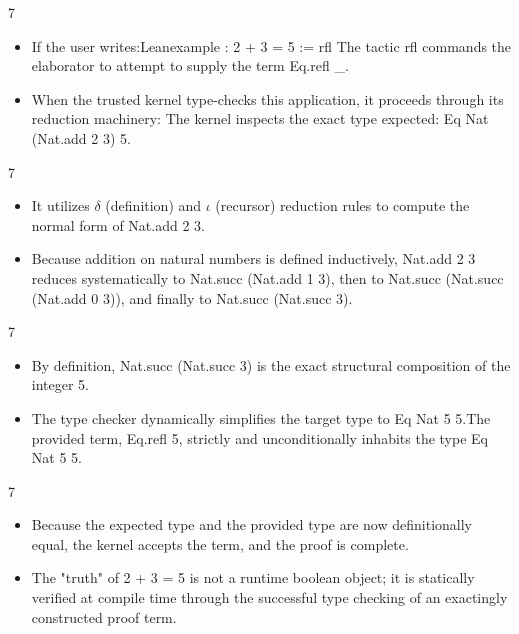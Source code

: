\documentclass[10pt]{beamer}
\begin{document}
\begin{frame}{7}
\begin{itemize}\setlength{\itemsep}{1.5em}
  \item If the user writes:Leanexample : 2 + 3 = 5 := rfl
The tactic rfl commands the elaborator to attempt to supply the term Eq.refl \_.
  \item When the trusted kernel type-checks this application, it proceeds through its reduction machinery:
The kernel inspects the exact type expected: Eq Nat (Nat.add 2 3) 5.
\end{itemize}
\end{frame}

\begin{frame}{7}
\begin{itemize}\setlength{\itemsep}{1.5em}
  \item It utilizes $\delta$ (definition) and $\iota$ (recursor) reduction rules to compute the normal form of Nat.add 2 3.
  \item Because addition on natural numbers is defined inductively, Nat.add 2 3 reduces systematically to Nat.succ (Nat.add 1 3), then to Nat.succ (Nat.succ (Nat.add 0 3)), and finally to Nat.succ (Nat.succ 3).
\end{itemize}
\end{frame}

\begin{frame}{7}
\begin{itemize}\setlength{\itemsep}{1.5em}
  \item By definition, Nat.succ (Nat.succ 3) is the exact structural composition of the integer 5.
  \item The type checker dynamically simplifies the target type to Eq Nat 5 5.The provided term, Eq.refl 5, strictly and unconditionally inhabits the type Eq Nat 5 5.
\end{itemize}
\end{frame}

\begin{frame}{7}
\begin{itemize}\setlength{\itemsep}{1.5em}
  \item Because the expected type and the provided type are now definitionally equal, the kernel accepts the term, and the proof is complete.
  \item The "truth" of 2 + 3 = 5 is not a runtime boolean object; it is statically verified at compile time through the successful type checking of an exactingly constructed proof term.
\end{itemize}
\end{frame}
\end{document}
